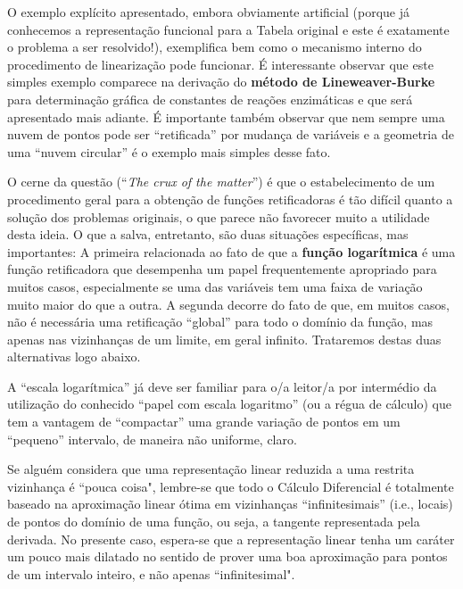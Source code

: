     O exemplo explícito apresentado, embora obviamente artificial (porque já conhecemos a representação funcional para a Tabela original e este é exatamente o problema a ser resolvido!), exemplifica bem como o mecanismo interno do procedimento de linearização pode funcionar. É interessante observar que este simples exemplo comparece na derivação do \textbf{método de Lineweaver-Burke} para determinação gráfica de constantes de reações enzimáticas e que será apresentado mais adiante. É importante também observar que nem sempre uma nuvem de pontos pode ser ``retificada'' por mudança de variáveis e a geometria de uma ``nuvem circular'' é o exemplo mais simples desse fato.

    O cerne da questão (``\textit{The crux of the matter}'') é que o estabelecimento de um procedimento geral para a obtenção de funções retificadoras é tão difícil quanto a solução dos problemas originais, o que parece não favorecer muito a utilidade desta ideia. O que a salva, entretanto, são duas situações específicas, mas importantes: A primeira relacionada ao fato de que a \textbf{função logarítmica} é uma função retificadora que desempenha um papel frequentemente apropriado para muitos casos, especialmente se uma das variáveis tem uma faixa de variação muito maior do que a outra. A segunda decorre do fato de que, em muitos casos, não é necessária uma retificação ``global'' para todo o domínio da função, mas apenas nas vizinhanças de um limite, em geral infinito. Trataremos destas duas alternativas logo abaixo.


\begin{remark}
    A ``escala logarítmica'' já deve ser familiar para o/a leitor/a por intermédio da utilização do conhecido ``papel com escala logaritmo'' (ou a régua de cálculo) que tem a vantagem de ``compactar'' uma grande variação de pontos em um ``pequeno'' intervalo, de maneira não uniforme, claro.
\end{remark}

\begin{remark}
    Se alguém considera que uma representação linear reduzida a uma restrita vizinhança é ``pouca coisa", lembre-se que todo o Cálculo Diferencial é totalmente baseado na aproximação linear ótima em vizinhanças ``infinitesimais'' (i.e., locais) de pontos do domínio de uma função, ou seja, a tangente representada pela derivada. No presente caso, espera-se que a representação linear tenha um caráter um pouco mais dilatado no sentido de prover uma boa aproximação para pontos de um intervalo inteiro, e não apenas ``infinitesimal".
\end{remark}

